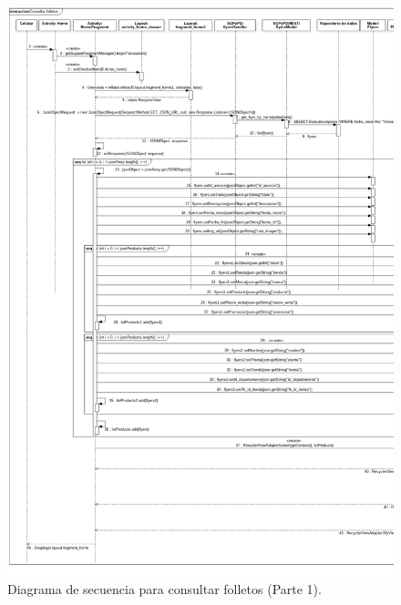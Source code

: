 \FloatBarrier
\begin{figure}[htbp!]
		\centering
			\includegraphics[width=.9 \textwidth]{imagenes/Diagramas_UserApp/Nuevos_diagramas/consultarFolletos1}
		\caption{Diagrama de secuencia para consultar folletos (Parte 1).}
		\label{image:DSConsultarFolletos2}
\end{figure}
\FloatBarrier

